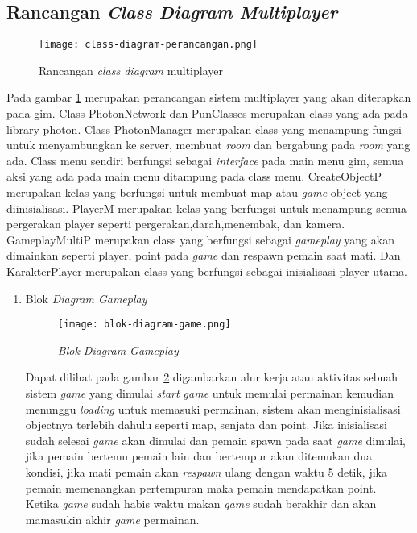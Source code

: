 \subsection{Rancangan \textit{Class Diagram Multiplayer}}
\begin{figure}[h]
   \centering
   \texttt{[image: class-diagram-perancangan.png]}
    \caption{Rancangan \textit{class diagram} multiplayer}
    \label{fig:class-diagram-game}
\end{figure}

Pada gambar \ref{fig:class-diagram-game} merupakan perancangan sistem multiplayer yang akan diterapkan pada gim.
Class PhotonNetwork dan PunClasses merupakan class yang ada pada library photon.
Class PhotonManager merupakan class yang menampung fungsi untuk menyambungkan ke server, membuat \textit{room} dan bergabung pada \textit{room} yang ada.
Class menu sendiri berfungsi sebagai \textit{interface} pada main menu gim, semua aksi yang ada pada main menu ditampung pada class menu.
CreateObjectP merupakan kelas yang berfungsi untuk membuat map atau \textit{game} object yang diinisialisasi.
PlayerM merupakan kelas yang berfungsi untuk menampung semua pergerakan player seperti pergerakan,darah,menembak, dan kamera.
GameplayMultiP merupakan class yang berfungsi sebagai \textit{gameplay} yang akan dimainkan seperti player, point pada \textit{game} dan respawn pemain saat mati.
Dan KarakterPlayer merupakan class yang berfungsi sebagai inisialisasi player utama.
\begin{enumerate}
    \item Blok \textit{Diagram Gameplay}
    \begin{figure}[h]
        \centering
        \texttt{[image: blok-diagram-game.png]}
        \caption{\textit{Blok Diagram Gameplay}}
        \label{fig:aclass-diagram-game}
    \end{figure}

    Dapat dilihat pada gambar \ref{fig:aclass-diagram-game} digambarkan alur kerja atau aktivitas sebuah sistem \textit{game} yang dimulai \textit{start game} untuk memulai permainan kemudian menunggu \textit{loading} untuk memasuki permainan, sistem akan menginisialisasi objectnya terlebih dahulu seperti map, senjata dan point.
    Jika inisialisasi sudah selesai \textit{game} akan dimulai dan pemain spawn pada saat \textit{game} dimulai, jika pemain bertemu pemain lain dan bertempur akan ditemukan dua kondisi, jika mati pemain akan \textit{respawn} ulang dengan waktu 5 detik, jika pemain memenangkan pertempuran maka pemain mendapatkan point.
    Ketika \textit{game} sudah habis waktu makan \textit{game} sudah berakhir dan akan mamasukin akhir \textit{game} permainan.
\end{enumerate}
\newpage

